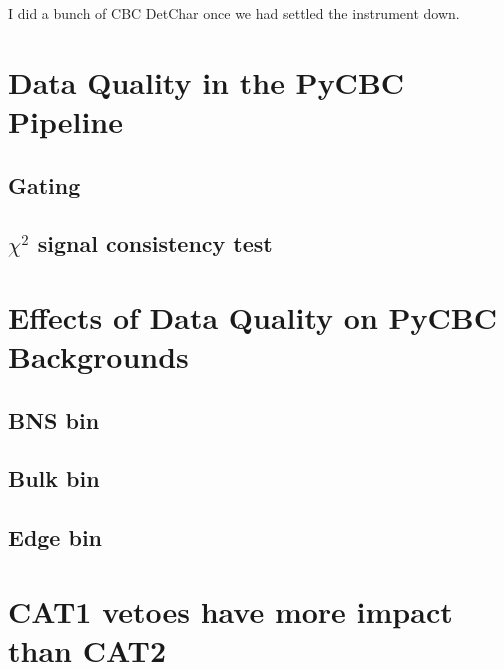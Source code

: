 I did a bunch of CBC DetChar once we had settled the instrument down.

\section{Data Quality in the PyCBC Pipeline}

\subsection{Gating}

\subsection{$\chi^{2}$ signal consistency test}

\section{Effects of Data Quality on PyCBC Backgrounds}

\subsection{BNS bin}

\subsection{Bulk bin}

\subsection{Edge bin}

\section{CAT1 vetoes have more impact than CAT2}


